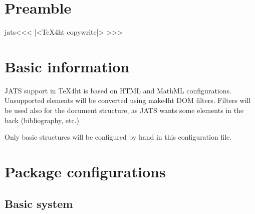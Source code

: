 %


\ifx \HTML\UnDef
   \def\HTML{jats}                   
   \def\CONFIG{\jobname}
   \def\MAKETITLE{\author{Eitan M. Gurari}}         
   \def\next{  \endinput}
   \expandafter\next
\fi




\chapter{Preamble}

\<jats\><<<
|<TeX4ht copywrite|>
>>>

  
\chapter{Basic information}

JATS support in TeX4ht is based on HTML and MathML configurations. 
Unsupported elements will be converted using make4ht DOM filters. 
Filters will be used also for the document structure, as JATS wants some
elements in the back (bibliography, etc.)

Only basic structures will be configured by hand in this configuration 
file.


\chapter{Package configurations}

\section{Basic system}

